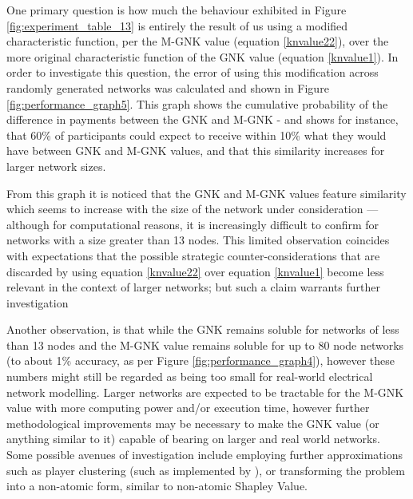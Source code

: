 One primary question is how much the behaviour exhibited in Figure \ref{fig:experiment_table_13} is entirely the result of us using a modified characteristic function, per the M-GNK value (equation \ref{knvalue22}), over the more original characteristic function of the GNK value (equation \ref{knvalue1}).
In order to investigate this question, the error of using this modification across randomly generated networks was calculated and shown in Figure \ref{fig:performance_graph5}.
This graph shows the cumulative probability of the difference in payments between the GNK and M-GNK - and shows for instance, that 60\% of participants could expect to receive within 10\% what they would have between GNK and M-GNK values, and that this similarity increases for larger network sizes.

From this graph it is noticed that the GNK and M-GNK values feature similarity which seems to increase with the size of the network under consideration --- although for computational reasons, it is increasingly difficult to confirm for networks with a size greater than 13 nodes.
This limited observation coincides with expectations that the possible strategic counter-considerations that are discarded by using equation \ref{knvalue22} over equation \ref{knvalue1} become less relevant in the context of larger networks; but such a claim warrants further investigation

Another observation, is that while the GNK remains soluble for networks of less than 13 nodes and the M-GNK value remains soluble for up to 80 node networks (to about 1\% accuracy, as per Figure \ref{fig:performance_graph4}), however these numbers might still be regarded as being too small for real-world electrical network modelling.
Larger networks are expected to be tractable for the M-GNK value with more computing power and/or execution time, however further methodological improvements may be necessary to make the GNK value (or anything similar to it) capable of bearing on larger and real world networks.
Some possible avenues of investigation include employing further approximations such as player clustering (such as implemented by \cite{DBLP:journals/corr/abs-1903-10965}), or transforming the problem into a non-atomic form, similar to non-atomic Shapley Value.

